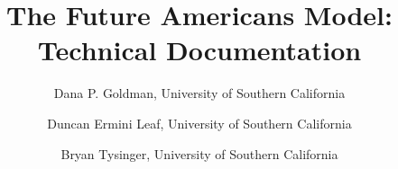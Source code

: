 \title{The Future Americans Model: Technical Documentation}
\author{
Dana P. Goldman, University of Southern California\\
\and Duncan Ermini Leaf, University of Southern California
\and Bryan Tysinger, University of Southern California\\
}
